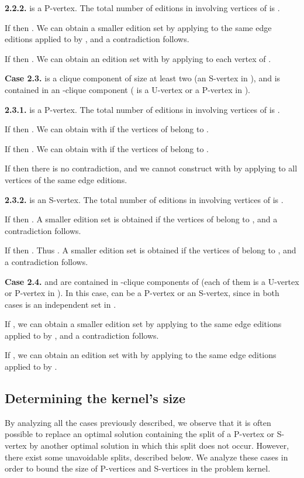\documentclass[12pt]{article}
\begin{document}
\textbf{2.2.2.}  is a P-vertex. The total number of editions in
 involving vertices of  is .

 If  then . We can obtain a smaller edition set by
applying to  the same edge editions applied to  by ,
and a contradiction follows.

 If   then . We can obtain an edition set  with
 by applying  to each vertex of .

\textbf{Case 2.3.}  is a clique component of size at least two
(an S-vertex in ), and  is contained in an
-clique component ( is a U-vertex or a P-vertex in
).

\textbf{2.3.1.}  is a P-vertex. The total number of editions in
 involving vertices of  is
.

 If  then
. We can
obtain  with  if the vertices of  belong to
.

 If  then . We can obtain  with  if the vertices of  belong to .

 If  then there is no
contradiction, and we cannot construct  with  by
applying to all vertices of  the same edge editions.

\textbf{2.3.2.}  is an S-vertex. The total number of editions
in  involving vertices of  is
.

 If  then
. A smaller edition set is obtained if
the vertices of  belong to , and a contradiction follows.

 If  then
. Thus
. A
smaller edition set is obtained if the vertices of  belong
to , and a contradiction follows.

\textbf{Case 2.4.}  and  are contained in -clique
components of  (each of them is a U-vertex or P-vertex in
). In this case,  can be a P-vertex or an
S-vertex, since in both cases  is an independent
set in .

 If , we can obtain a smaller
edition set by applying to  the same edge editions applied
to  by , and a contradiction follows.

 If  , we can obtain an edition set  with  by applying to  the same
edge editions applied to  by .


\subsection{Determining the kernel's size}

By analyzing all the cases previously described, we observe that it is
often possible to replace an optimal solution containing the
split of a P-vertex or S-vertex by another optimal solution in
which this split does not occur. However, there exist some
unavoidable splits, described below. We analyze these
cases in order to bound the size of P-vertices and S-vertices in
the problem kernel.
\end{document}

